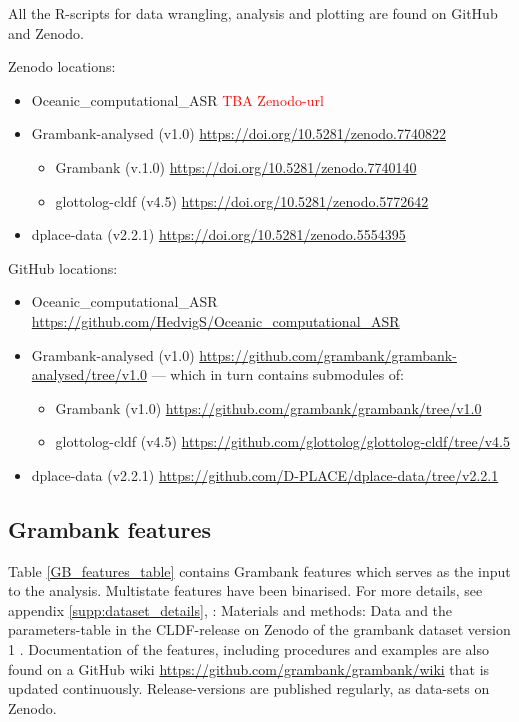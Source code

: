 \documentclass[12pt,letterpaper]{article}
\begin{document}
All the R-scripts for data wrangling, analysis and plotting are found on GitHub and Zenodo.

Zenodo locations:

\begin{itemize}
\item Oceanic\_computational\_ASR  \textcolor{red}{TBA Zenodo-url}
\item Grambank-analysed (v1.0) \url{https://doi.org/10.5281/zenodo.7740822}
\begin{itemize}
\item Grambank (v.1.0) \url{https://doi.org/10.5281/zenodo.7740140}
\item glottolog-cldf (v4.5) \url{https://doi.org/10.5281/zenodo.5772642}
\end{itemize}
\item dplace-data (v2.2.1) \url{https://doi.org/10.5281/zenodo.5554395}
\end{itemize}

GitHub locations:
\begin{itemize}
\item Oceanic\_computational\_ASR \url{https://github.com/HedvigS/Oceanic_computational_ASR}
\item Grambank-analysed (v1.0) \url{https://github.com/grambank/grambank-analysed/tree/v1.0} --- which in turn contains submodules of:
\begin{itemize}
\item Grambank (v1.0) \url{https://github.com/grambank/grambank/tree/v1.0}
\item glottolog-cldf (v4.5) \url{https://github.com/glottolog/glottolog-cldf/tree/v4.5}
\end{itemize}
\item dplace-data (v2.2.1) \url{https://github.com/D-PLACE/dplace-data/tree/v2.2.1}
\end{itemize}



\subsection{Grambank features}
\label{Grambank_features}
Table \ref{GB_features_table} contains Grambank features which serves as the input to the analysis. Multistate features have been binarised. For more details, see appendix \ref{supp:dataset_details}, \citet{grambank_release}: Materials and methods: Data and the parameters-table in the CLDF-release on Zenodo of the grambank dataset version 1 \citep{grambank_dataset_zenodo_v1}. Documentation of the features, including procedures and examples are also found on a GitHub wiki  \url{https://github.com/grambank/grambank/wiki} that is updated continuously. Release-versions are published regularly, as data-sets on Zenodo.
\end{document}
